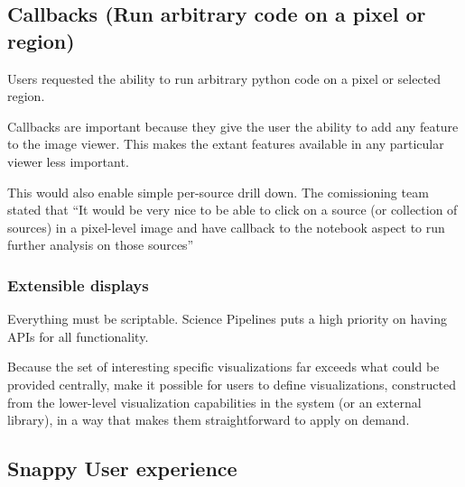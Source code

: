 \subsection{Callbacks (Run arbitrary code on a pixel or region)}

Users requested the ability to run arbitrary python code on a pixel or selected region.

Callbacks are important because they give the user the ability to add any feature to the image viewer.
This makes the extant features available in any particular viewer less important.

This would also enable simple per-source drill down.
The comissioning team stated that  ``It would be very nice to be able to click on a source (or collection of sources) in a pixel-level image and have callback to the notebook aspect to run further analysis on those sources''


\subsubsection{Extensible displays}

Everything must be scriptable.
Science Pipelines puts a high priority on having APIs for all functionality.

Because the set of interesting specific visualizations far exceeds what could be provided centrally, make it possible for users to define visualizations, constructed from the lower-level visualization capabilities in the system (or an external library), in a way that makes them straightforward to apply on demand.

\subsection{Snappy User experience}

